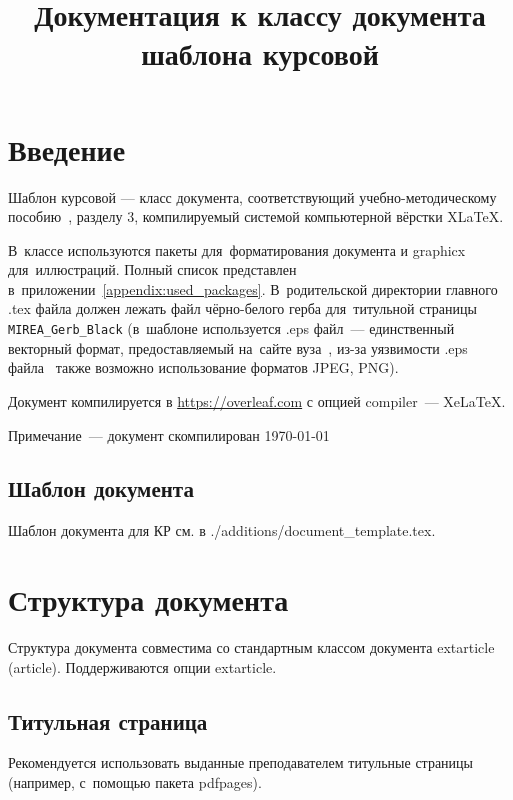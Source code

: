 \documentclass{SIBGU-state}
\title{Документация к классу документа шаблона курсовой}
\begin{document}
\maketitle
\addtocounter{page}{1}

\tableofcontents

\section*{Введение}
{}

Шаблон курсовой --- класс документа, соответствующий у\-чеб\-но-ме\-то\-ди\-чес\-ко\-му пособию~\cite{bib:recomendations}, разделу 3, компилируемый системой компьютерной вёрстки X\LaTeX. 

В~классе используются пакеты для~форматирования документа и graphicx для~иллюстраций. Полный список представлен в~приложении~\ref{appendix:used_packages}. В~родительской директории главного .tex файла должен лежать файл чёрно-белого герба для~титульной страницы \verb"MIREA_Gerb_Black" (в~шаблоне используется .eps файл~--- единственный векторный формат, предоставляемый на~сайте вуза~\cite{bib:symbol}, из-за уязвимости .eps файла~\cite{bib:eps_cve} также возможно использование форматов JPEG, PNG).

Документ компилируется в \url{https://overleaf.com} с опцией compiler~--- XeLaTeX. 

Примечание~--- документ скомпилирован \today

\subsection*{Шаблон документа}

Шаблон документа для КР см. в ./additions/document\_template.tex.


\section{Структура документа}

Структура документа совместима со стандартным классом документа extarticle (article). Поддерживаются опции extarticle.


\subsection{Титульная страница}

Рекомендуется использовать выданные преподавателем титульные страницы (например, с~помощью пакета pdfpages).
\end{document}
